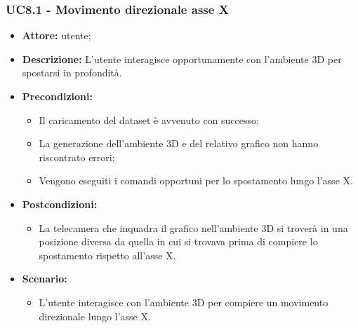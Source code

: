 \subsubsection{UC8.1 - Movimento direzionale asse X}
\begin{itemize}    
    \item \textbf{Attore:} utente;
    \item \textbf{Descrizione:} L'utente interagisce opportunamente con l'ambiente 3D per spostarsi in profondità.
    \item \textbf{Precondizioni:}    
        \begin{itemize}
            \item Il caricamento del dataset è avvenuto con successo;
            \item La generazione dell'ambiente 3D e del relativo grafico non hanno riscontrato errori;
            \item Vengono eseguiti i comandi opportuni per lo spostamento lungo l'asse X.
        \end{itemize}    
    \item \textbf{Postcondizioni:}
        \begin{itemize}
            \item La telecamera che inquadra il grafico nell'ambiente 3D si troverà in una posizione diversa da quella in cui si trovava prima di compiere lo spostamento rispetto all'asse X.
        \end{itemize}    
    \item \textbf{Scenario:} 
        \begin{itemize}
            \item L'utente interagisce con l'ambiente 3D per compiere un movimento direzionale lungo l'asse X.
        \end{itemize}
\end{itemize}
